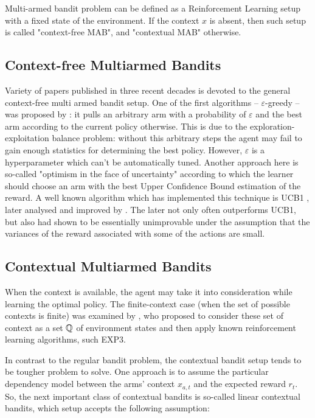   Multi-armed bandit problem can be defined as a Reinforcement Learning setup with a fixed state of the environment. If the context $x$ is absent, then such setup is called "context-free MAB", and "contextual MAB" otherwise. 
  
  \subsection{Context-free Multiarmed Bandits}
  Variety of papers published in three recent decades is devoted to the general context-free multi armed bandit setup. One of the first algorithms -- $\varepsilon$-greedy -- was proposed by \cite{Auer2002}: it pulls an arbitrary arm with a probability of $\varepsilon$ and the best arm according to the current policy otherwise. This is due to the exploration-exploitation balance problem: without this arbitrary steps the agent may fail to gain enough statistics for determining the best policy. However, $\varepsilon$ is a hyperparameter which can't be automatically tuned. Another approach here is so-called "optimism in the face of uncertainty" \cite{Lai1985} according to which the learner should choose an arm with the best Upper Confidence Bound estimation of the reward. A well known algorithm which has implemented this technique is UCB1 \cite{Auer2002}, later analysed and improved by \cite{Audibert2009}. The later not only often outperforms UCB1, but also had shown to be essentially unimprovable under the assumption that the variances of the reward associated with some of the actions are small.
  
  \subsection{Contextual Multiarmed Bandits}
  When the context is available, the agent may take it into consideration while learning the optimal policy. The finite-context case (when the set of possible contexts is finite) was examined by \cite{Auer2002b}, who proposed to consider these set of context as a set $\operatorname{\mathbb{Q}}$ of environment states and then apply known reinforcement learning algorithms, such EXP3. 
  
  In contrast to the regular bandit problem, the contextual bandit setup tends to be tougher problem to solve. One approach is to assume the particular dependency model between the arms' context $x_{a,t}$ and the expected reward $r_t$. So, the next important class of contextual bandits is so-called linear contextual bandits, which setup accepts the following assumption:
  
